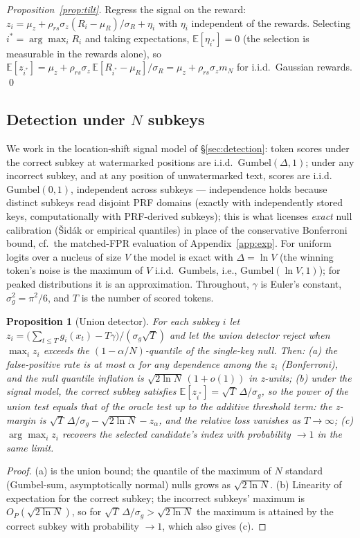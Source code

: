 \documentclass{article} %
\newtheorem{proposition}{Proposition}
\begin{document}
\emph{Proposition~\ref{prop:tilt}.} Regress the signal on the reward:
$z_i=\mu_z+\rho_{rs}\sigma_z(R_i-\mu_R)/\sigma_R+\eta_i$ with $\eta_i$
independent of the rewards. Selecting $i^\ast=\arg\max_i R_i$ and taking
expectations, $\mathbb E[\eta_{i^\ast}]=0$ (the selection is measurable in the
rewards alone), so
$\mathbb E[z_{i^\ast}]=\mu_z+\rho_{rs}\sigma_z\,
\mathbb E[R_{i^\ast}-\mu_R]/\sigma_R=\mu_z+\rho_{rs}\sigma_z m_N$ for
i.i.d.\ Gaussian rewards. \qed

\subsection{Detection under $N$ subkeys}\label{app:detection}
We work in the location-shift signal model of \S\ref{sec:detection}: token
scores under the correct subkey at watermarked positions are i.i.d.\
$\mathrm{Gumbel}(\Delta,1)$; under any incorrect subkey, and at any position of
unwatermarked text, scores are i.i.d.\ $\mathrm{Gumbel}(0,1)$, independent
across subkeys --- independence holds because distinct subkeys read disjoint
PRF domains (exactly with independently stored keys, computationally with
PRF-derived subkeys);
this is what licenses \emph{exact} null calibration (\v{S}id\'ak or
empirical quantiles) in place of the conservative Bonferroni bound, cf.\ the
matched-FPR evaluation of Appendix~\ref{app:exp}. For uniform logits over a nucleus of size $V$ the model is exact
with $\Delta=\ln V$ (the winning token's noise is the maximum of $V$ i.i.d.\
Gumbels, i.e., $\mathrm{Gumbel}(\ln V,1)$); for peaked distributions it is an approximation.
Throughout, $\gamma$ is Euler's constant,
$\sigma_g^2=\pi^2/6$, and $T$ is the number of scored tokens.

\begin{proposition}[Union detector]\label{prop:union}
For each subkey $i$ let
$z_i=\big(\sum_{t\le T} g_i(x_t)-T\gamma\big)/(\sigma_g\sqrt T)$ and let the
union detector reject when $\max_i z_i$ exceeds the $(1-\alpha/N)$-quantile of
the single-key null. Then:
(a) the false-positive rate is at most $\alpha$ for \emph{any} dependence among
the $z_i$ (Bonferroni), and the null quantile inflation is
$\sqrt{2\ln N}\,(1+o(1))$ in z-units;
(b) under the signal model, the correct subkey satisfies
$\mathbb E[z_{i^*}]=\sqrt T\,\Delta/\sigma_g$, so the power of the union test
equals that of the oracle test up to the additive threshold term:
the z-margin is $\sqrt T\,\Delta/\sigma_g-\sqrt{2\ln N}-z_\alpha$, and the
relative loss vanishes as $T\to\infty$;
(c) $\arg\max_i z_i$ recovers the selected candidate's index with probability
$\to1$ in the same limit.
\end{proposition}
\begin{proof}
(a) is the union bound; the quantile of the maximum of $N$ standard (Gumbel-sum,
asymptotically normal) nulls grows as $\sqrt{2\ln N}$.
(b) Linearity of expectation for the correct subkey; the incorrect subkeys'
maximum is $O_P(\sqrt{2\ln N})$, so for
$\sqrt T\,\Delta/\sigma_g>\sqrt{2\ln N}$ the maximum is attained by the correct
subkey with probability $\to1$, which also gives (c).
\end{proof}
\end{document}
